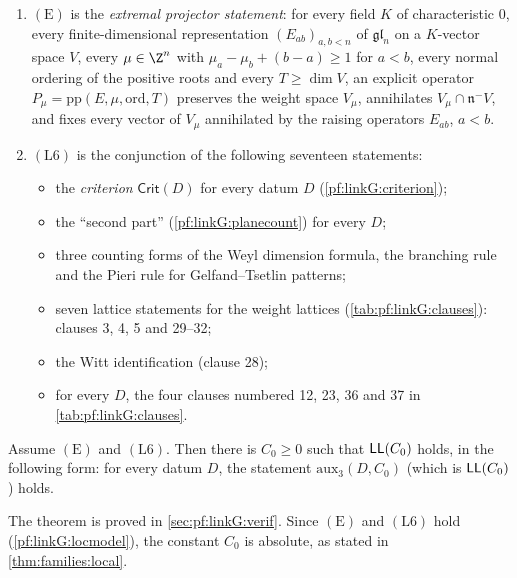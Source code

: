 \begin{definition}\label{pf:linkG:hyps}
\begin{enumerate}[label=(\alph*)]
\item $(\mathrm E)$ is the \emph{extremal projector statement}: for every field $K$ of characteristic $0$, every
finite-dimensional representation $(E_{ab})_{a,b<n}$ of $\mathfrak{gl}_n$ on a $K$-vector space $V$, every
$\mu\in\Z^n$ with $\mu_a-\mu_b+(b-a)\ge1$ for $a<b$, every normal ordering of the positive roots and every
$T\ge\dim V$, an explicit operator $P_\mu=\mathrm{pp}(E,\mu,\mathrm{ord},T)$ preserves the weight space $V_\mu$,
annihilates $V_\mu\cap\mathfrak n^-V$, and fixes every vector of $V_\mu$ annihilated by the raising operators
$E_{ab}$, $a<b$.
\item $(\mathrm{L}6)$ is the conjunction of the following seventeen statements:
\begin{itemize}
\item the \emph{criterion} $\mathsf{Crit}(D)$ for every datum $D$ (\cref{pf:linkG:criterion});
\item the ``second part'' (\cref{pf:linkG:planecount}) for every $D$;
\item three counting forms of the Weyl dimension formula, the branching rule and the Pieri rule for
Gelfand--Tsetlin patterns;
\item seven lattice statements for the weight lattices (\cref{tab:pf:linkG:clauses}):
clauses 3, 4, 5 and 29--32;
\item the Witt identification (clause 28);
\item for every $D$, the four clauses numbered 12, 23, 36 and 37 in \cref{tab:pf:linkG:clauses}.
\end{itemize}
\end{enumerate}
\end{definition}

\begin{theorem}\label{pf:linkG:localthm}
Assume $(\mathrm E)$ and $(\mathrm L6)$. Then there is $C_0\ge0$ such that $\mathsf{LL}(C_0)$ holds, in the following
form: for every datum $D$, the statement $\mathrm{aux}_3(D,C_0)$ (which is $\mathsf{LL}(C_0)$) holds.
\end{theorem}

The theorem is proved in \cref{sec:pf:linkG:verif}. Since $(\mathrm E)$ and $(\mathrm L6)$ hold
(\cref{pf:linkG:locmodel}), the constant $C_0$ is absolute, as stated in \cref{thm:families:local}.

